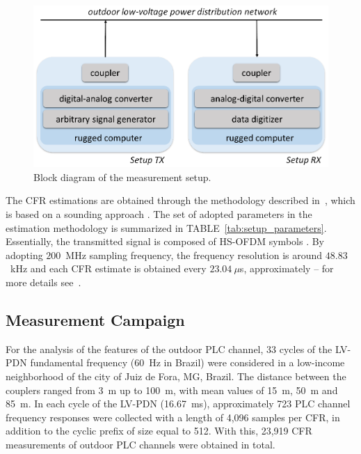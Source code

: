 \documentclass[journal]{IEEEtran}
\begin{document}
	\begin{figure}[htb]
		\begin{centering}
			\includegraphics[scale=.6]{Figuras/setups.eps}
			\caption{Block diagram of the measurement setup.}
			\label{fig:setup}
		\end{centering}
	\end{figure}
	
	The \ac{CFR} \color{blue} estimations \color{black} are obtained through the  methodology described in~\cite{Oliveira2014}, which is based on a sounding approach \cite{Parsons1991}. 
	The set of adopted parameters in the estimation methodology is summarized in TABLE~\ref{tab:setup_parameters}.
	Essentially, the transmitted signal is composed of \ac{HS-OFDM} symbols \cite{Ribeiro2014a}. 
	By adopting  $200$~MHz sampling frequency, the frequency resolution is around $48.83$~kHz and each \ac{CFR} estimate is obtained every $23.04~\mu$s, approximately -- for more details see~\cite{Oliveira2013a}. 
	
	\subsection{Measurement Campaign}
	For the analysis of the features of the outdoor PLC channel, 33 cycles of the \ac{LV-PDN} fundamental frequency (60~Hz in Brazil) were considered in a low-income neighborhood of the city of Juiz de Fora, MG, Brazil. 
	The distance between the couplers ranged from 3~m up to 100~m, with mean values of 15~m, 50~m and 85~m. 
	In each cycle of the \ac{LV-PDN} (16.67~ms), approximately 723 PLC channel frequency responses were collected with a length of 4,096 samples per CFR, in addition to the cyclic prefix of size equal to 512. 
	With this, 23,919 CFR measurements of outdoor PLC channels were \color{blue} obtained \color{black} in total.
	
\end{document}
